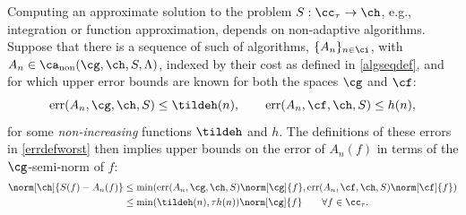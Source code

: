 \documentclass[]{elsarticle}
\DeclareMathOperator{\fix}{non}
\DeclareMathOperator{\err}{err}
\theoremstyle{definition}
\theoremstyle{remark}
\begin{document}
Computing an approximate solution to the problem $S: \cc_{\tau} \to \ch$, e.g., integration or function approximation, depends on non-adaptive algorithms. Suppose that there is a sequence of such of algorithms, $\{A_n\}_{n \in \ci}$, with $A_n  \in \ca_{\fix}(\cg,\ch,S,\Lambda)$, indexed by their cost as defined in \eqref{algseqdef}, and for which upper error bounds are known for both the spaces $\cg$ and $\cf$:
\begin{equation}\label{algseqerrbd}
\err(A_n,\cg,\ch,S) \le \tildeh(n), \qquad \err(A_n,\cf,\ch,S) \le h(n), 
\end{equation}
for some \emph{non-increasing} functions $\tildeh$ and $h$.  The definitions of these errors in \eqref{errdefworst} then implies upper bounds on the error of $A_n(f)$ in terms of the $\cg$-semi-norm of $f$:
\begin{align} \nonumber
\norm[\ch]{S(f) -  A_n(f)} &\le \min(\err(A_n,\cg,\ch,S)\norm[\cg]{f},\err(A_n,\cf,\ch,S)\norm[\cf]{f}) \\
\label{Anerrbound}
&\le \min(\tildeh(n),\tau h(n))\norm[\cg]{f} \qquad \forall f \in \cc_{\tau}.
\end{align}
\end{document}

